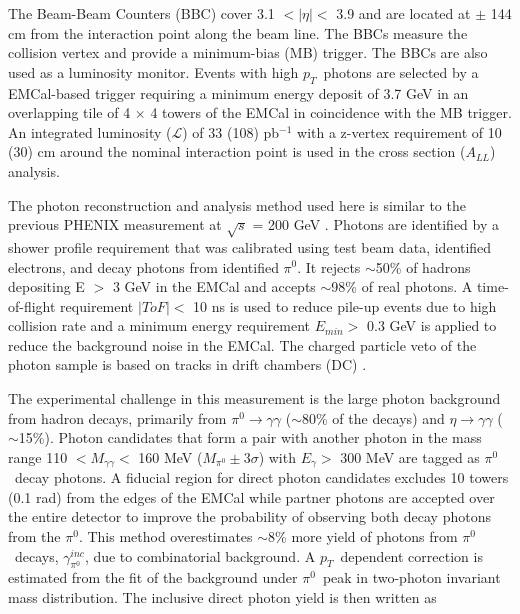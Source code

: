 \documentclass[twocolumn,letterpaper,aps,prl,longbibliography,superscriptaddress,floatfix]{revtex4-2}
\newcommand{\pT}{\ensuremath{p_T}}
\newcommand{\pizero}{\ensuremath{\pi^0}}
\newcommand{\ALL}{\ensuremath{A_{LL}}}
\begin{document}


The Beam-Beam Counters (BBC) \cite{ALLEN2003549} cover 3.1 $< |\eta| <$ 3.9 and are located at $\pm$ 144 cm from the interaction point along the beam line. The BBCs measure the collision vertex and provide a minimum-bias (MB) trigger. The BBCs are also used as a luminosity monitor. Events with high \pT\ photons are selected by a EMCal-based trigger requiring a minimum energy deposit of 3.7 GeV in an overlapping tile of 4 $\times$ 4 towers of the EMCal in coincidence with the MB trigger. An integrated luminosity ($\mathcal{L}$) of 33 (108) pb$^{-1}$ with a z-vertex requirement of 10 (30) cm around the nominal interaction point is used in the cross section (\ALL) analysis.
 
The photon reconstruction and analysis method used here is similar to the previous PHENIX measurement at $\sqrt{s}$ =  200 GeV \cite{PhysRevLett.98.012002,PhysRevD.86.072008}. Photons are identified by a shower profile requirement that was calibrated using test beam data, identified electrons, and decay photons from identified \pizero. It rejects $\sim$50\% of hadrons depositing E $>$ 3 GeV in the EMCal and accepts $\sim$98\% of real photons. A time-of-flight requirement $|ToF| <$ 10 ns is used to reduce pile-up events due to high collision rate and a minimum energy requirement $E_{min} >$ 0.3 GeV is applied to reduce the background noise in the EMCal. The charged particle veto of the photon sample is based on tracks in drift chambers (DC) \cite{ADCOX2003489}. 

The experimental challenge in this measurement is the large photon background from hadron decays, primarily from $\pi^0 \rightarrow \gamma\gamma$ ($\sim$80\% of the decays) and $\eta \rightarrow \gamma\gamma$ ($\sim$15\%). Photon candidates that form a pair with another photon in the mass range 110 $< M_{\gamma\gamma} <$ 160 MeV ($M_{\pi^0} \pm 3\sigma$) with $E_{\gamma} >$ 300 MeV are tagged as \pizero\ decay photons. A fiducial region for direct photon candidates excludes 10 towers (0.1 rad) from the edges of the EMCal while partner photons are accepted over the entire detector to improve the probability of observing both decay photons from the \pizero. This method overestimates $\sim$8\% more yield of photons from \pizero\ decays, $\gamma_{\pi^0}^{inc}$, due to combinatorial background. A \pT\ dependent correction is estimated from the fit of the background under \pizero\ peak in two-photon invariant mass distribution. The inclusive direct photon yield is then written as
\end{document}
